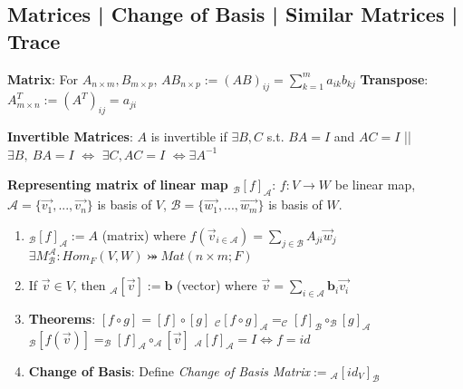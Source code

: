 \documentclass[9pt]{article}
\begin{document}
\subsection{Matrices | Change of Basis | Similar Matrices | Trace} %

\textbf{Matrix}: For $A_{n\times m},B_{m\times p}$, $AB_{n\times p}:=(AB)_{ij}=\sum_{k=1}^{m}a_{ik}b_{kj}$ \quad \textbf{Transpose}: $A^T_{m\times n}:=(A^T)_{ij}=a_{ji}$

\textbf{Invertible Matrices}: {\small $A$ is invertible if $\exists B,C$ s.t. $BA=I$ and $AC=I$ \quad || \quad $\exists B, \ BA=I$ $\Leftrightarrow$ $\exists C,AC=I$ $\Leftrightarrow \exists A^{-1}$} 

\textbf{Representing matrix of linear map $_{\mathcal{B}}[f]_{\mathcal{A}}$}: $f:V\to W$ be linear map, $\mathcal{A}=\{\vec{v_1},...,\vec{v_n}\}$ is basis of $V$, $\mathcal{B}=\{\vec{w_1},...,\vec{w_m}\}$ is basis of $W$.

\begin{enumerate}[itemsep=-2pt, topsep=-2pt]
    \item $_{\mathcal{B}}[f]_{\mathcal{A}}:=A$ {\small (matrix)} where $f(\vec{v}_{i\in\mathcal{A}})=\sum_{j\in\mathcal{B}}A_{ji}\vec{w}_j$ \quad \quad $\exists M^{\mathcal{A}}_{\mathcal{B}}:Hom_{F}(V,W)\bij Mat(n\times m;F)$
    \item If $\vec{v}\in V$, then $_{\mathcal{A}}[\vec{v}]:=\mathbf{b}$ {\small (vector)} where $\vec{v}=\sum_{i\in\mathcal{A}}\mathbf{b}_i\vec{v_i}$
    \item \textbf{Theorems}: $[f\circ g]=[f]\circ[g]$ \quad \quad $_{\mathcal{C}}[f\circ g]_{\mathcal{A}}=_{\mathcal{C}}[f]_{\mathcal{B}}\circ_{\mathcal{B}}[g]_{\mathcal{A}}$ \quad \quad $_{\mathcal{B}}[f(\vec{v})]=_{\mathcal{B}}[f]_{\mathcal{A}}\circ_{\mathcal{A}}[\vec{v}]$ \quad \quad $_{\mathcal{A}}[f]_{\mathcal{A}}=I\Leftrightarrow f=id$
    \item \textbf{Change of Basis}: {\small Define \textit{Change of Basis Matrix}$:=$$_{\mathcal{A}}[id_V]_{\mathcal{B}}$ \quad {}}
\end{enumerate}
\end{document}
